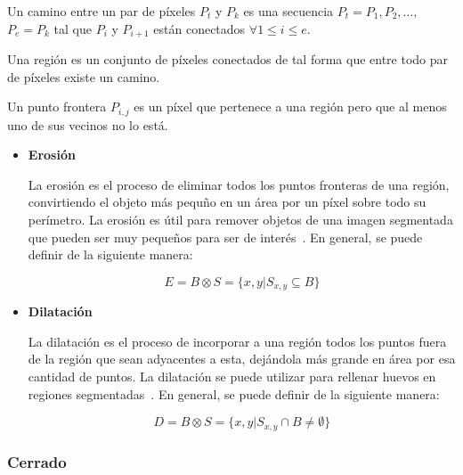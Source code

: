 \begin{definition}
	Un camino entre un par de píxeles $P_t$ y $P_k$ es una secuencia $P_t = P_1, P_2, \ldots,$ $P_e = P_k$ tal que $P_i$ y $P_{i + 1}$ están conectados $\forall 1 \leq i \leq e$.
\end{definition}

\begin{definition}
	Una región es un conjunto de píxeles conectados de tal forma que entre todo par de píxeles existe un camino.
\end{definition}

\begin{definition}
	Un punto frontera $P_{i, j}$ es un píxel que pertenece a una región pero que al menos uno de sus vecinos no lo está.
\end{definition}

\begin{itemize}
	\item \textbf{Erosión}
	
	La erosión es el proceso de eliminar todos los puntos fronteras de una región, convirtiendo el objeto más pequño en un área por un píxel sobre todo su perímetro. La erosión es útil para remover objetos de una imagen segmentada que pueden ser muy pequeños para ser de interés~\cite{castleman1996digital}. En general, se puede definir de la siguiente manera:
	
	\begin{equation}
		E = B \otimes S = \{x, y | S_{x, y} \subseteq B\}
	\end{equation}

	\item \textbf{Dilatación}
	
	La dilatación es el proceso de incorporar a una región todos los puntos fuera de la región que sean adyacentes a esta, dejándola más grande en área por esa cantidad de puntos. La dilatación se puede utilizar para rellenar huevos en regiones segmentadas~\cite{castleman1996digital}. En general, se puede definir de la siguiente manera:
	
	\begin{equation}
		D = B \otimes S = \{x, y | S_{x, y} \cap B \neq \emptyset\}
	\end{equation}
\end{itemize}

\subsubsection{Cerrado}

